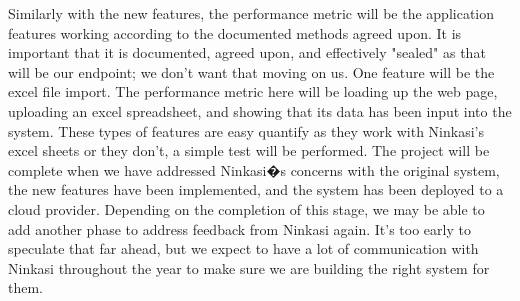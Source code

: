 \documentclass[draftclsnofoot,onecolumn,journal,letterpaper,10pt]{IEEEtran}
\begin{document}
Similarly with the new features, the performance metric will be the application features working according to the documented methods agreed upon.  It is important that it is documented, agreed upon, and effectively "sealed" as that will be our endpoint; we don't want that moving on us.  One feature will be the excel file import.  The performance metric here will be loading up the web page, uploading an excel spreadsheet, and showing that its data has been input into the system.  These types of features are easy quantify as they work with Ninkasi's excel sheets or they don't, a simple test will be performed.
The project will be complete when we have addressed Ninkasi�s concerns with the original system, the new features have been implemented, and the system has been deployed to a cloud provider. Depending on the completion of this stage, we may be able to add another phase to address feedback from Ninkasi again. It’s too early to speculate that far ahead, but we expect to have a lot of communication with Ninkasi throughout the year to make sure we are building the right system for them. 







%
%
\end{document}
